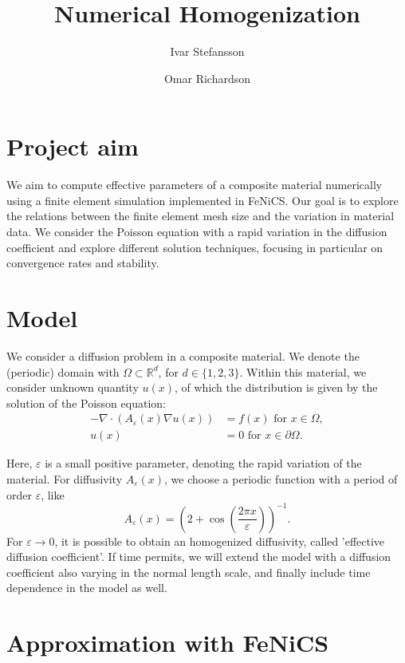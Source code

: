 \documentclass{article}
\title{Numerical Homogenization}\author[1]{Ivar Stefansson}
\author[2]{Omar Richardson}
\affil[1]{Department of Mathematics and Computer Science, Karlstad University}
\affil[2]{Department of Mathematics, University of Bergen}
\renewcommand{\epsilon}{\varepsilon}
\newcommand{\R}{\mathbb{ R}}
\begin{document}
\maketitle
\section{Project aim}
\label{sec:project_aim}

We aim to compute effective parameters of a composite material numerically using a finite element simulation implemented in FeNiCS.
Our goal is to explore the relations between the finite element mesh size and the variation in material data.
We consider the Poisson equation with a rapid variation in the diffusion coefficient and explore different solution techniques, focusing in particular on convergence rates and stability.

\section{Model}
\label{sec:model}
We consider a diffusion problem in a composite material. We denote the (periodic) domain with $\Omega \subset \R^d$, for $d\in\{1,2,3\}$. Within this material, we consider unknown quantity $u(x)$, of which the distribution is given by the solution of the Poisson equation:
\begin{equation}
    \begin{split}
        -\nabla \cdot (A_\epsilon(x)\nabla u(x)) &= f(x) \mbox{ for } x \in \Omega,\\
        u(x) &= 0 \mbox{ for } x \in \partial\Omega.
    \end{split}
    \label{eq:model}
\end{equation}

Here, $\epsilon$ is a small positive parameter, denoting the rapid variation of the material.
For diffusivity $A_\epsilon(x)$, we choose a periodic function with a period of order $\epsilon$, like
$$$$
\begin{equation}
   A_\epsilon(x) = \left( 2+\cos\left(\frac{2\pi x}{\epsilon}\right) \right)^{-1}.
   \label{eq:diff_param}
\end{equation}
For $\epsilon \to 0$, it is possible to obtain an homogenized diffusivity, called 'effective diffusion coefficient'.
If time permits, we will extend the model with a diffusion coefficient also varying in the normal length scale, and finally include time dependence in the model as well.

\section{Approximation with FeNiCS}
\label{sec:one_dim_approx}
\end{document}
